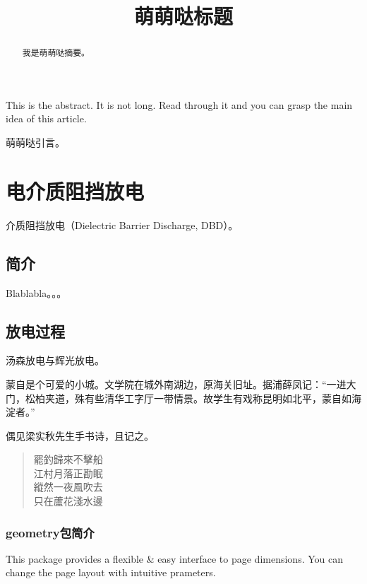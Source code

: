 \documentclass{dutrep}
\begin{document}
	\title{萌萌哒标题}
	\maketitle

	\begin{abstract}
		我是萌萌哒摘要。
	\end{abstract}


	\begin{abstractEN}
		This is the abstract. It is not long. Read through it and you can grasp the main idea of this article.

	\end{abstractEN}


	\tableofcontents

	\begin{introduction}
		萌萌哒引言。
	\end{introduction}

	\chapter{电介质阻挡放电}
	介质阻挡放电（Dielectric Barrier Discharge, DBD）。
	\section{简介}
	Blablabla。。。

	\lipsum[2-10]
	\section{放电过程}
	汤森放电与辉光放电。

	蒙自是个可爱的小城。文学院在城外南湖边，原海关旧址。据浦薛凤记：“一进大门，松柏夹道，殊有些清华工字厅一带情景。故学生有戏称昆明如北平，蒙自如海淀者。” \cite{1}

	偶见梁实秋先生手书诗，且记之。
	\begin{verse}
		罷釣歸來不擊船\\
		江村月落正勘眠\\
		縱然一夜風吹去\\
		只在蘆花淺水邊
	\end{verse}
	\subsection{\textsf{geometry}包简介}
	This package provides a flexible \& easy interface to page dimensions. You can change the page layout with intuitive prameters. \cite{1}
\end{document}
